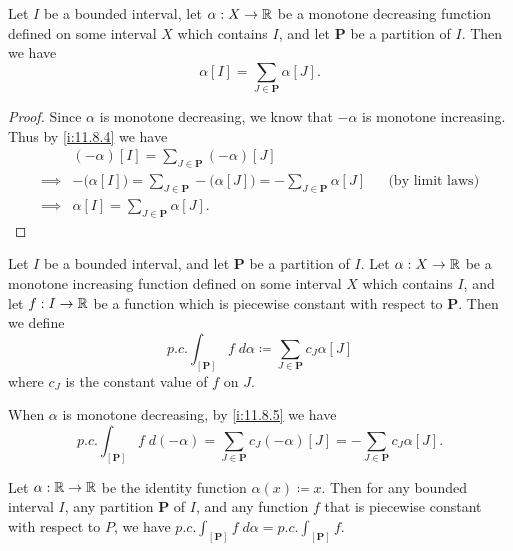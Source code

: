 \begin{ac}\label{i:ac:11.8.3}
  Let \(I\) be a bounded interval, let \(\alpha : X \to \mathbb{R}\) be a monotone decreasing function defined on some interval \(X\) which contains \(I\), and let \(\mathbf{P}\) be a partition of \(I\).
  Then we have
  \[
    \alpha[I] = \sum_{J \in \mathbf{P}} \alpha[J].
  \]
\end{ac}

\begin{proof}
  Since \(\alpha\) is monotone decreasing, we know that \(-\alpha\) is monotone increasing.
  Thus by \cref{i:11.8.4} we have
  \begin{align*}
             & (-\alpha)[I] = \sum_{J \in \mathbf{P}} (-\alpha)[J]                                                                                  \\
    \implies & -\big(\alpha[I]\big) = \sum_{J \in \mathbf{P}} -\big(\alpha[J]\big) = -\sum_{J \in \mathbf{P}} \alpha[J] &  & \text{(by limit laws)} \\
    \implies & \alpha[I] = \sum_{J \in \mathbf{P}} \alpha[J].
  \end{align*}
\end{proof}

\begin{defn}\label{i:11.8.5}
  Let \(I\) be a bounded interval, and let \(\mathbf{P}\) be a partition of \(I\).
  Let \(\alpha : X \to \mathbb{R}\) be a monotone increasing function defined on some interval \(X\) which contains \(I\), and let \(f : I \to \mathbb{R}\) be a function which is piecewise constant with respect to \(\mathbf{P}\).
  Then we define
  \[
    p.c. \int_{[\mathbf{P}]} f \; d \alpha \coloneqq \sum_{J \in \mathbf{P}} c_J \alpha[J]
  \]
  where \(c_J\) is the constant value of \(f\) on \(J\).
\end{defn}

\begin{note}
  When \(\alpha\) is monotone decreasing, by \cref{i:11.8.5} we have
  \[
    p.c. \int_{[\mathbf{P}]} f \; d (-\alpha) = \sum_{J \in \mathbf{P}} c_J (-\alpha)[J] = - \sum_{J \in \mathbf{P}} c_J \alpha[J].
  \]
\end{note}

\setcounter{thm}{6}
\begin{eg}\label{i:11.8.7}
  Let \(\alpha : \mathbb{R} \to \mathbb{R}\) be the identity function \(\alpha(x) \coloneqq x\).
  Then for any bounded interval \(I\), any partition \(\mathbf{P}\) of \(I\), and any function \(f\) that is piecewise constant with respect to \(P\), we have \(p.c. \int_{[\mathbf{P}]} f \; d \alpha = p.c. \int_{[\mathbf{P}]} f\).
\end{eg}

